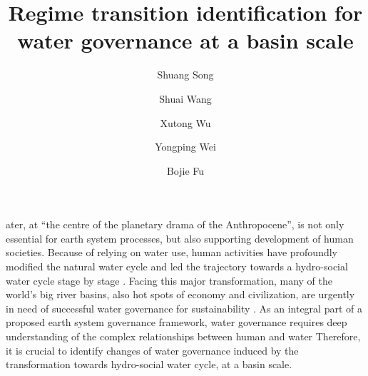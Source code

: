 \documentclass[9pt, twocolumn, twoside, lineno]{pnas-new}
\title{Regime transition identification for water governance at a basin scale}
\author[a, b]{Shuang Song}  %
\author[a, b]{Shuai Wang}  %
\author[c, d]{Xutong Wu}  %
\author[e]{Yongping Wei} %
\author[a, b, 1]{Bojie Fu}  %
\affil[a]{ %
	State Key Laboratory of Earth Surface Processes and Resource Ecology, 
	Faculty of Geographical Science, 
	Beijing Normal University, 
	Beijing 100875, 
	P.R. China
}
\affil[b]{ %
	Institute of Land Surface System and Sustainability, 
	Faculty of Geographical Science, 
	Beijing Normal University, 
	Beijing 100875, 
	P.R. China
}
\affil[c]{ %
	College of Urban and Environmental Sciences, 
	Peking University, 
	Beijing 100871, 
	P.R. China
}
\affil[d]{ %
	State Key Laboratory of Urban and Regional Ecology, 
	Research Center for Eco-Environmental Sciences, 
	Chinese Academy of Sciences, 
	Beijing 100085, 
	P.R. China 
}
\affil[e]{ %
	School of Earth and Environmental Sciences, 
	The University of Queensland, 
	Brisbane 4067, 
	Australia
}
\begin{document}
\maketitle
\thispagestyle{firststyle}

\label{introduction-section-1}
ater, at “the centre of the planetary drama of the Anthropocene”, is not only essential for earth system processes, but also supporting development of human societies. 
Because of relying on water use, human activities have profoundly modified the natural water cycle and led the trajectory towards a hydro-social water cycle stage by stage
\cite{gleeson2020,sivapalan2012,qin2014,abbott2019,levia2020}.
Facing this major transformation, many of the world's big river basins, also hot spots of economy and civilization, are urgently in need of successful water governance for sustainability
\cite{bestAnthropogenicStressesWorld2019,falkenmark2019,dibaldassarre2019}. 
As an integral part of a proposed earth system governance framework, water governance requires deep understanding of the complex relationships between human and water
\cite{biermann2012,steffen2020,dibaldassarre2019}
Therefore, it is crucial to identify changes of water governance induced by the transformation towards hydro-social water cycle, at a basin scale.
\end{document}
